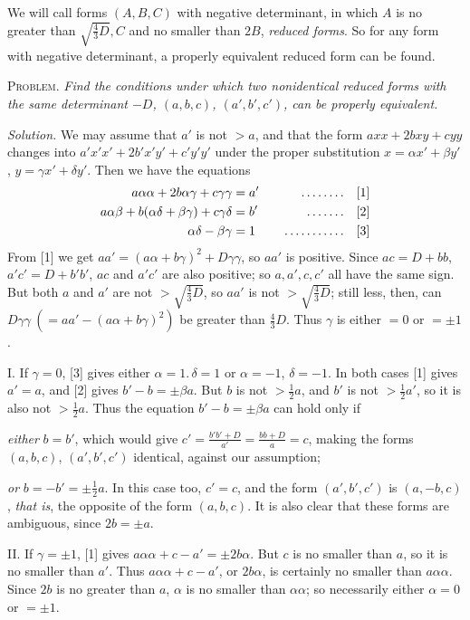 We will call forms $(A,B,C)$ with negative determinant, in which $A$ is no greater than $\surd{\frac43 D},C$ and no smaller than $2B$, \emph{reduced forms}. So for any form with negative determinant, a properly equivalent reduced form can be found.

\textsc{Problem.} \emph{Find the conditions under which two nonidentical reduced forms with the same determinant $-D$, $(a,b,c)$, $(a',b',c')$, can be properly equivalent.}

\emph{Solution.} We may assume that $a'$ is not $>a$, and that the form $axx+2bxy+cyy$ changes into $a'x'x'+2b'x'y'+c'y'y'$ under the proper substitution $x=\alpha x'+\beta y'$, $y=\gamma x'+\delta y'$. Then we have the equations
\[
\begin{aligned}
a\alpha\alpha+2b\alpha\gamma+c\gamma\gamma&=a'&\quad\mathinner{.\,.\,.\,.\,.\,.\,.\,.}\quad&[1]\\
a\alpha\beta+b(\alpha\delta+\beta\gamma)+c\gamma\delta&=b'&\quad\mathinner{.\,.\,.\,.\,.\,.\,.}\quad&[2]\\
\alpha\delta-\beta\gamma&=1&\quad\mathinner{.\,.\,.\,.\,.\,.\,.\,.\,.\,.\,.}\quad&[3]
\end{aligned}
\]
From [1] we get $aa'=(a\alpha+b\gamma)^2+D\gamma\gamma$, so $aa'$ is positive. Since $ac=D+bb$, $a'c'=D+b'b'$, $ac$ and $a'c'$ are also positive; so $a,a',c,c'$ all have the same sign. But both $a$ and $a'$ are not $>\surd{\frac43 D}$, so $aa'$ is not $>\surd{\frac43 D}$; still less, then, can $D\gamma\gamma\ (=aa'-(a\alpha+b\gamma)^2)$ be greater than $\frac43 D$. Thus $\gamma$ is either $=0$ or $=\pm1$.

I. If $\gamma=0$, [3] gives either $\alpha=1.\,\delta=1$ or $\alpha=-1$, $\delta=-1$.
In both cases [1] gives $a'=a$, and [2] gives $b'-b=\pm\beta a$. But $b$ is not $>\frac12 a$, and $b'$ is not $>\frac12 a'$, so it is also not $>\frac12 a$. Thus the equation $b'-b=\pm\beta a$ can hold only if

\emph{either} $b=b'$, which would give $c'=\frac{b'b'+D}{a'}=\frac{bb+D}{a}=c$, making the forms $(a,b,c)$, $(a',b',c')$ identical, against our assumption;

\emph{or} $b=-b'=\pm\frac12 a$. In this case too, $c'=c$, and the form $(a',b',c')$ is $(a,-b,c)$, \emph{that is}, the opposite of the form $(a,b,c)$. It is also clear that these forms are ambiguous, since $2b=\pm a$.

II. If $\gamma=\pm1$, [1] gives $a\alpha\alpha+c-a'=\pm2b\alpha$. But $c$ is no smaller than $a$, so it is no smaller than $a'$. Thus $a\alpha\alpha+c-a'$, or $2b\alpha$, is certainly no smaller than $a\alpha\alpha$. Since $2b$ is no greater than $a$, $\alpha$ is no smaller than $\alpha\alpha$; so necessarily either $\alpha=0$ or $=\pm1$.

